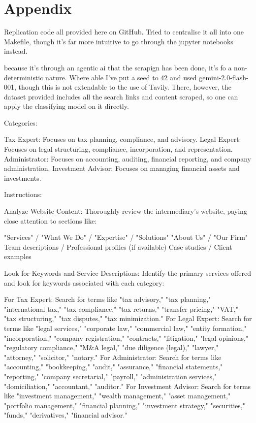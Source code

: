 \chapter{Appendix}
\label{chap:appendix}

Replication code all provided here on GitHub. Tried to centralise it all into one Makefile, though it's far more intuitive to go through the jupyter notebooks instead.

because it's through an agentic ai that the scrapign has been done, it's fo a non-deterministic nature. Where able I've put a seed to 42 and used gemini-2.0-flash-001, though this is not extendable to the use of Tavily. There, however, the dataset provided includes all the search links and content scraped, so one can apply the classifying model on it directly.

Categories:

Tax Expert: Focuses on tax planning, compliance, and advisory.
Legal Expert: Focuses on legal structuring, compliance, incorporation, and representation.
Administrator: Focuses on accounting, auditing, financial reporting, and company administration.
Investment Advisor: Focuses on managing financial assets and investments.

Instructions:

Analyze Website Content: Thoroughly review the intermediary's website, paying close attention to sections like:

"Services" / "What We Do" / "Expertise" / "Solutions"
"About Us" / "Our Firm"
Team descriptions / Professional profiles (if available)
Case studies / Client examples

Look for Keywords and Service Descriptions: Identify the primary services offered and look for keywords associated with each category:

For Tax Expert: Search for terms like "tax advisory," "tax planning," "international tax," "tax compliance," "tax returns," "transfer pricing," "VAT," "tax structuring," "tax disputes," "tax minimization."
For Legal Expert: Search for terms like "legal services," "corporate law," "commercial law," "entity formation," "incorporation," "company registration," "contracts," "litigation," "legal opinions," "regulatory compliance," "M\&A legal," "due diligence (legal)," "lawyer," "attorney," "solicitor," "notary." %
For Administrator: Search for terms like "accounting," "bookkeeping," "audit," "assurance," "financial statements," "reporting," "company secretarial," "payroll," "administration services," "domiciliation," "accountant," "auditor."
For Investment Advisor: Search for terms like "investment management," "wealth management," "asset management," "portfolio management," "financial planning," "investment strategy," "securities," "funds," "derivatives," "financial advisor."


